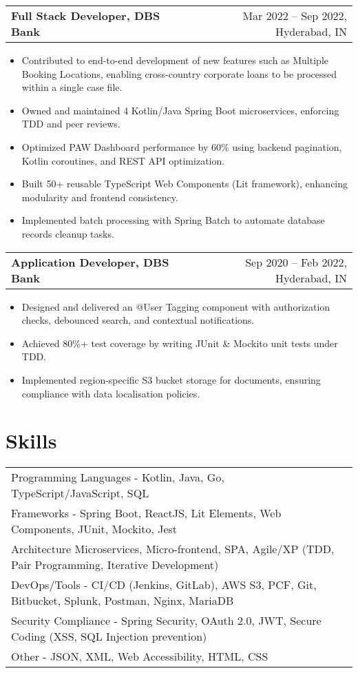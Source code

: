 \documentclass[a4paper,12pt]{article}
\makeatletter
\newenvironment{joblong}[2]
    {
    \begin{tabularx}{\linewidth}{@{}l X r@{}}
    \textbf{#1} & &  #2 \\
    \end{tabularx}
    \begin{minipage}[t]{\linewidth}
    \begin{itemize}[nosep,after=\strut, leftmargin=1em, itemsep=3pt,label=--]
    }
    {
    \end{itemize}
    \end{minipage}    
    }
\makeatother
\begin{document}
\begin{joblong}{Full Stack Developer, DBS Bank}{Mar 2022 -- Sep 2022, Hyderabad, IN}
\item Contributed to end-to-end development of new features such as Multiple Booking Locations, enabling cross-country corporate loans to be processed within a single case file.
\item Owned and maintained 4 Kotlin/Java Spring Boot microservices, enforcing TDD and peer reviews.
\item Optimized PAW Dashboard performance by 60\% using backend pagination, Kotlin coroutines, and REST API optimization.
\item Built 50+ reusable TypeScript Web Components (Lit framework), enhancing modularity and frontend consistency.
\item Implemented batch processing with Spring Batch to automate database records cleanup tasks.
\end{joblong}

\begin{joblong}{Application Developer, DBS Bank}{Sep 2020 -- Feb 2022, Hyderabad, IN}
\item Designed and delivered an @User Tagging component with authorization checks, debounced search, and contextual notifications.
\item Achieved 80\%+ test coverage by writing JUnit \& Mockito unit tests under TDD.
\item Implemented region-specific S3 bucket storage for documents, ensuring compliance with data localisation policies.
\end{joblong}

\section{Skills}
\begin{tabularx}{\linewidth}{@{}l X@{}}
Programming Languages - Kotlin, Java, Go, TypeScript/JavaScript, SQL \\
Frameworks - Spring Boot, ReactJS, Lit Elements, Web Components, JUnit, Mockito, Jest \\
Architecture  Microservices, Micro-frontend, SPA, Agile/XP (TDD, Pair Programming, Iterative Development) \\
DevOps/Tools -  CI/CD (Jenkins, GitLab), AWS S3, PCF, Git, Bitbucket, Splunk, Postman, Nginx, MariaDB \\
Security Compliance - Spring Security, OAuth 2.0, JWT, Secure Coding (XSS, SQL Injection prevention) \\
Other - JSON, XML, Web Accessibility, HTML, CSS \\
\end{tabularx}
\end{document}
